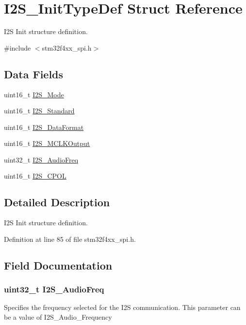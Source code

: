 \hypertarget{struct_i2_s___init_type_def}{\section{I2\-S\-\_\-\-Init\-Type\-Def Struct Reference}
\label{struct_i2_s___init_type_def}
}


I2\-S Init structure definition.  




{\ttfamily \#include $<$stm32f4xx\-\_\-spi.\-h$>$}

\subsection*{Data Fields}
\begin{DoxyCompactItemize}
\item 
uint16\-\_\-t \hyperlink{struct_i2_s___init_type_def_ab239a97360862b2514410fef774686f5}{I2\-S\-\_\-\-Mode}
\item 
uint16\-\_\-t \hyperlink{struct_i2_s___init_type_def_a0f0c02142c68e2c2f0038ca79bdbd365}{I2\-S\-\_\-\-Standard}
\item 
uint16\-\_\-t \hyperlink{struct_i2_s___init_type_def_a5d36bbd1f2aa29414ae1d25c3cc0d66c}{I2\-S\-\_\-\-Data\-Format}
\item 
uint16\-\_\-t \hyperlink{struct_i2_s___init_type_def_a4e49b94b867428b8abf8e5385fb0879d}{I2\-S\-\_\-\-M\-C\-L\-K\-Output}
\item 
uint32\-\_\-t \hyperlink{struct_i2_s___init_type_def_aabe09351d033858f65fb27add7c50918}{I2\-S\-\_\-\-Audio\-Freq}
\item 
uint16\-\_\-t \hyperlink{struct_i2_s___init_type_def_a948d79d6388454da8459fea27c338900}{I2\-S\-\_\-\-C\-P\-O\-L}
\end{DoxyCompactItemize}


\subsection{Detailed Description}
I2\-S Init structure definition. 

Definition at line 85 of file stm32f4xx\-\_\-spi.\-h.



\subsection{Field Documentation}
\hypertarget{struct_i2_s___init_type_def_aabe09351d033858f65fb27add7c50918}{
\subsubsection[{I2\-S\-\_\-\-Audio\-Freq}]{\setlength{\rightskip}{0pt plus 5cm}uint32\-\_\-t I2\-S\-\_\-\-Audio\-Freq}}\label{struct_i2_s___init_type_def_aabe09351d033858f65fb27add7c50918}
Specifies the frequency selected for the I2\-S communication. This parameter can be a value of I2\-S\-\_\-\-Audio\-\_\-\-Frequency 

